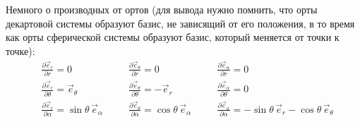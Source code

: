 Немного о производных от ортов (для вывода нужно помнить, что орты декартовой системы образуют базис, не зависящий от его положения, в то время как орты сферической системы образуют базис, который меняется от точки к точке):
\[
	\begin{aligned}
	& \frac{\partial \vec{e}_r}{\partial r} = 0 \\
	& \frac{\partial \vec{e}_r}{\partial \theta} = \vec{e}_\theta \\
	& \frac{\partial \vec{e}_r}{\partial \alpha} = \sin \theta\, \vec{e}_\alpha
	\end{aligned}
	\quad
	\begin{aligned}
	& \frac{\partial \vec{e}_\theta}{\partial r} = 0 \\
	& \frac{\partial \vec{e}_\theta}{\partial \theta} = -\vec{e}_r \\
	& \frac{\partial \vec{e}_\theta}{\partial \alpha} = \cos \theta\, \vec{e}_\alpha
	\end{aligned}
	\quad
	\begin{aligned}
	& \frac{\partial \vec{e}_\alpha}{\partial r} = 0 \\
	& \frac{\partial \vec{e}_\alpha}{\partial \theta} = 0 \\
	& \frac{\partial \vec{e}_\alpha}{\partial \alpha} = -\sin\theta \, \vec{e}_r -\cos \theta\, \vec{e}_\theta
	\end{aligned}
\]
